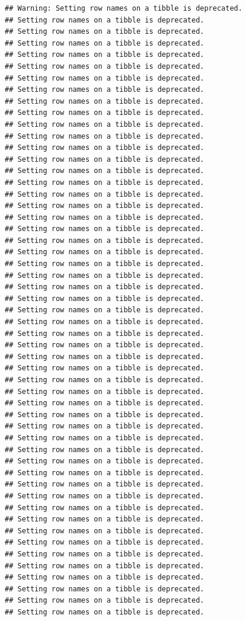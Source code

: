 \documentclass[
]{article}
\begin{document}
\begin{verbatim}
## Warning: Setting row names on a tibble is deprecated.
## Setting row names on a tibble is deprecated.
## Setting row names on a tibble is deprecated.
## Setting row names on a tibble is deprecated.
## Setting row names on a tibble is deprecated.
## Setting row names on a tibble is deprecated.
## Setting row names on a tibble is deprecated.
## Setting row names on a tibble is deprecated.
## Setting row names on a tibble is deprecated.
## Setting row names on a tibble is deprecated.
## Setting row names on a tibble is deprecated.
## Setting row names on a tibble is deprecated.
## Setting row names on a tibble is deprecated.
## Setting row names on a tibble is deprecated.
## Setting row names on a tibble is deprecated.
## Setting row names on a tibble is deprecated.
## Setting row names on a tibble is deprecated.
## Setting row names on a tibble is deprecated.
## Setting row names on a tibble is deprecated.
## Setting row names on a tibble is deprecated.
## Setting row names on a tibble is deprecated.
## Setting row names on a tibble is deprecated.
## Setting row names on a tibble is deprecated.
## Setting row names on a tibble is deprecated.
## Setting row names on a tibble is deprecated.
## Setting row names on a tibble is deprecated.
## Setting row names on a tibble is deprecated.
## Setting row names on a tibble is deprecated.
## Setting row names on a tibble is deprecated.
## Setting row names on a tibble is deprecated.
## Setting row names on a tibble is deprecated.
## Setting row names on a tibble is deprecated.
## Setting row names on a tibble is deprecated.
## Setting row names on a tibble is deprecated.
## Setting row names on a tibble is deprecated.
## Setting row names on a tibble is deprecated.
## Setting row names on a tibble is deprecated.
## Setting row names on a tibble is deprecated.
## Setting row names on a tibble is deprecated.
## Setting row names on a tibble is deprecated.
## Setting row names on a tibble is deprecated.
## Setting row names on a tibble is deprecated.
## Setting row names on a tibble is deprecated.
## Setting row names on a tibble is deprecated.
## Setting row names on a tibble is deprecated.
## Setting row names on a tibble is deprecated.
## Setting row names on a tibble is deprecated.
## Setting row names on a tibble is deprecated.
## Setting row names on a tibble is deprecated.
## Setting row names on a tibble is deprecated.
## Setting row names on a tibble is deprecated.
## Setting row names on a tibble is deprecated.
## Setting row names on a tibble is deprecated.

\end{verbatim}
\end{document}
